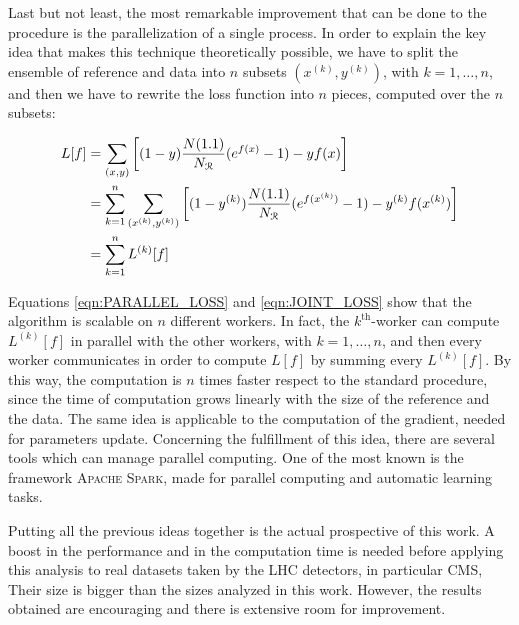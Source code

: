 Last but not least, the most remarkable improvement that can be done to the procedure is the parallelization of a single process. In order to explain the key idea that makes this technique theoretically possible, we have to split the ensemble of reference and data into $n$ subsets $(x^{(k)},y^{(k)})$, with $k=1,\dots,n$, and then we have to rewrite the loss function into $n$ pieces, computed over the $n$ subsets:

\begin{align}
	L[f]
	&= 
	\sum_{(x,y)} \left[
	(1-y) \frac{N(1.1)}{N_{\mathcal{R}}} (e^{f(x)} - 1) - yf(x)
	\right]	\nonumber \\
	&=
	\sum_{k=1}^{n} \sum_{(x^{(k)},y^{(k)})} \left[
	(1-y^{(k)}) \frac{N(1.1)}{N_{\mathcal{R}}} (e^{f(x^{(k)})} - 1) - y^{(k)}f(x^{(k)})
	\right]	\label{eqn:PARALLEL_LOSS}	\\
	&=
	\sum_{k=1}^{n}
	L^{(k)}[f]	\label{eqn:JOINT_LOSS}
\end{align}

\noindent
Equations \ref{eqn:PARALLEL_LOSS} and \ref{eqn:JOINT_LOSS} show that the algorithm is scalable on $n$ different workers. In fact, the $k^\text{th}$-worker can compute $L^{(k)}[f]$ in parallel with the other workers, with $k=1,\dots,n$, and then every worker communicates in order to compute $L[f]$ by summing every $L^{(k)}[f]$. By this way, the computation is $n$ times faster respect to the standard procedure, since the time of computation grows linearly with the size of the reference and the data. The same idea is applicable to the computation of the gradient, needed for parameters update. Concerning the fulfillment of this idea, there are several tools which can manage parallel computing. One of the most known is the framework \textsc{Apache Spark}, made for parallel computing and automatic learning tasks.

\bigskip
Putting all the previous ideas together is the actual prospective of this work. A boost in the performance and in the computation time is needed before applying this analysis to real datasets taken by the LHC detectors, in particular CMS, Their size is bigger than the sizes analyzed in this work. However, the results obtained are encouraging and there is extensive room for improvement.